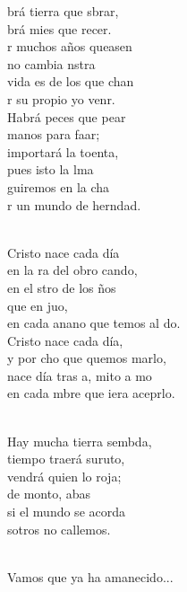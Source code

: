\begin{cancion}%
	brá tierra que sbrar,\\
	brá mies que recer.\\
	r muchos años queasen\\
	no cambia nstra \\
	 vida es de los que chan\\
	r su propio yo venr.\\
	Habrá peces que pear\\
	manos para faar;\\
	 importará la toenta,\\
	pues isto la lma\\
	guiremos en la cha\\
	r un mundo de herndad. \\\jump\\
	\begin{chorus}%
Cristo nace cada día\\
	en la ra del obro cando,\\
	en el stro de los ños\\
	que en juo, \\
	en cada anano que temos al do.\\
Cristo nace cada día,\\
	y por cho que quemos marlo,\\
	nace día tras a, mito a mo  \\
	en cada mbre que iera aceprlo.\\
	\end{chorus}%
	\jump\\
	Hay mucha tierra sembda,\\
	 tiempo traerá suruto,\\
	 vendrá quien lo roja;\\
	de monto, abas\\
	si el mundo se acorda\\
	sotros no callemos.\\\jump\\
	\begin{chorus}%
Vamos que ya ha amanecido...\\
	\end{chorus}%
	\jump\\
\end{cancion}%

